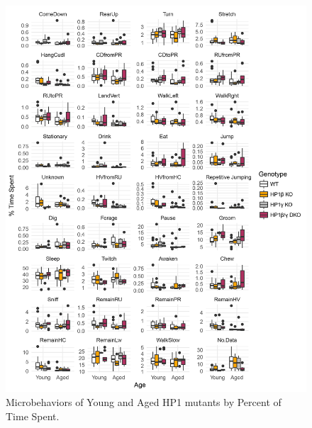 \documentclass[onehalf,12pt]{beavtex}
\begin{document}
  \begin{figure}
  
  {\centering \includegraphics[width=1\linewidth, ]{./figure/results/HCSpercent} 
  
  }
  
  \caption[Individual Microbehaviors of Young and Aged HP1 mutants by Percent of Time Spent]{Microbehaviors of Young and Aged HP1 mutants by Percent of Time Spent.  }\label{fig:HCSpercent}
  \end{figure}
  
\end{document}
